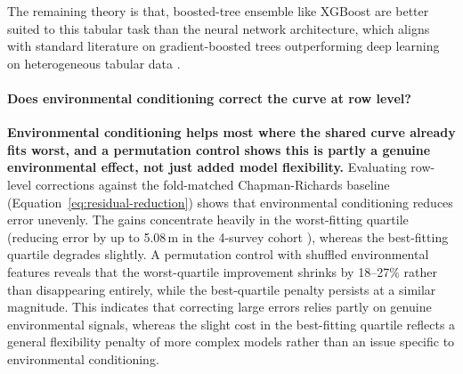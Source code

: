 \documentclass[logo,msc,ai]{infthesis}           %
\begin{document}
The remaining theory is that, boosted-tree ensemble like XGBoost are better suited to this tabular task than the neural network architecture, which aligns with standard literature on gradient-boosted trees outperforming deep learning on heterogeneous tabular data \cite{shwartzziv2021Tabular_C4_NN}.



\paragraph*{Does environmental conditioning correct the curve at row level?}
\textbf{Environmental conditioning helps most where the shared curve already fits worst, and a permutation control shows this is partly a genuine environmental effect, not just added model flexibility.}
Evaluating row-level corrections against the fold-matched Chapman-Richards baseline (Equation~\ref{eq:residual-reduction}) shows that environmental conditioning reduces error unevenly. The gains concentrate heavily in the worst-fitting quartile (reducing error by up to 5.08\,m in the 4-survey cohort %
), whereas the best-fitting quartile degrades slightly. A permutation control with shuffled environmental features reveals that the worst-quartile improvement shrinks by 18--27\% rather than disappearing entirely, while the best-quartile penalty persists at a similar magnitude. This indicates that correcting large errors relies partly on genuine environmental signals, whereas the slight cost in the best-fitting quartile reflects a general flexibility penalty of more complex models rather than an issue specific to environmental conditioning.

\end{document}
